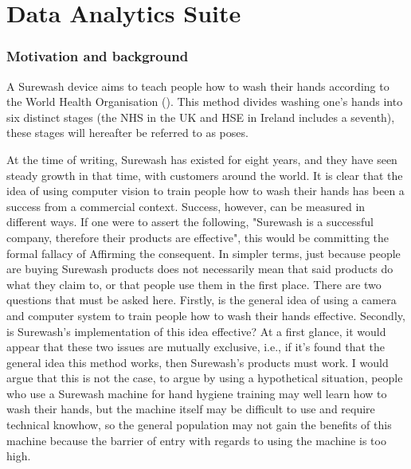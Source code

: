 \part{Data Analytics Suite}
\section{Motivation and background}
A Surewash device aims to teach people how to wash their hands according to the World Health Organisation (\cite{who_handhygiene}). This method divides washing one's hands into six distinct stages (the NHS in the UK and HSE in Ireland includes a seventh), these stages will hereafter be referred to as poses.

At the time of writing, Surewash has existed for eight years, and they have seen steady growth in that time, with customers around the world. It is clear that the idea of using computer vision to train people how to wash their hands has been a success from a commercial context. Success, however, can be measured in different ways. If one were to assert the following, "Surewash is a successful company, therefore their products are effective", this would be committing the formal fallacy of Affirming the consequent. In simpler terms, just because people are buying Surewash products does not necessarily mean that said products do what they claim to, or that people use them in the first place. There are two questions that must be asked here. Firstly, is the general idea of using a camera and computer system to train people how to wash their hands effective. Secondly, is Surewash's implementation of this idea effective? At a first glance, it would appear that these two issues are mutually exclusive, i.e., if it's found that the general idea this method works, then Surewash's products must work. I would argue that this is not the case, to argue by using a hypothetical situation, people who use a Surewash machine for hand hygiene training may well learn how to wash their hands, but the machine itself may be difficult to use and require technical knowhow, so the general population may not gain the benefits of this machine because the barrier of entry with regards to using the machine is too high.

